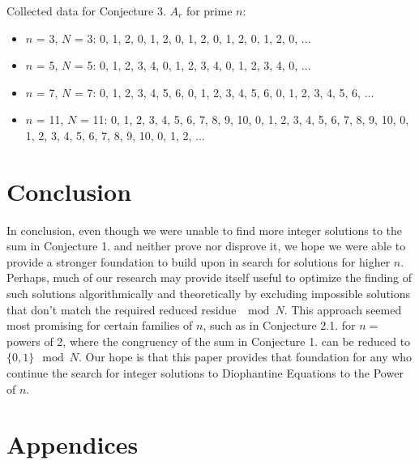\documentclass{article}
\begin{document}
\begin{flushleft}
    \vspace{.1in}

    Collected data for Conjecture 3. $A_r$ for prime $n$:
    \begin{itemize}
        \item $n$ = 3, $N$ = 3:  0, 1, 2, 0, 1, 2, 0, 1, 2, 0, 1, 2, 0, 1, 2, 0, ...
        \item $n$ = 5, $N$ = 5:  0, 1, 2, 3, 4, 0, 1, 2, 3, 4, 0, 1, 2, 3, 4, 0, ...
        \item $n$ = 7, $N$ = 7:  0, 1, 2, 3, 4, 5, 6, 0, 1, 2, 3, 4, 5, 6, 0, 1, 2, 3, 4, 5, 6, ...
        \item $n$ = 11, $N$ = 11:  0, 1, 2, 3, 4, 5, 6, 7, 8, 9, 10, 0, 1, 2, 3, 4, 5, 6, 7, 8, 9, 10, 0, 1, 2, 3, 4, 5, 6, 7, 8, 9, 10, 0, 1, 2, ...
    \end{itemize}

\section{Conclusion}
In conclusion, even though we were unable to find more integer solutions to the sum in Conjecture 1. and neither prove nor disprove it, we hope we were able to provide a stronger foundation to build upon in search for solutions for higher $n$. Perhaps, much of our research may provide itself useful to optimize the finding of such solutions algorithmically and theoretically by excluding impossible solutions that don't match the required reduced residue $\mod N$. This approach seemed most promising for certain families of $n$, such as in Conjecture 2.1. for $n=$ powers of 2, where the congruency of the sum in Conjecture 1. can be reduced to $\{0,1\}\mod N$. Our hope is that this paper provides that foundation for any who continue the search for integer solutions to Diophantine Equations to the Power of $n$.


\newpage

\section{Appendices}

\end{flushleft}
\end{document}
